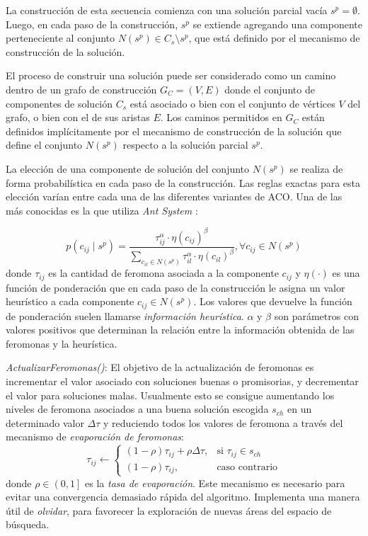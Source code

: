 \documentclass{llncs}
\begin{document}
	La construcción de esta secuencia comienza con una solución parcial vacía 
	$s^p = \emptyset$. Luego, en cada paso de la construcción, $s^p$ se extiende agregando una
	componente perteneciente al conjunto $N(s^p) \in C_s \setminus s^p$, que está definido por 
	el mecanismo de construcción de la solución.
	
	El proceso de construir una solución puede ser considerado como un camino dentro de un grafo
	de construcción $G_C = (V, E)$ donde el conjunto de componentes de solución $C_s$ está
	asociado o bien con el conjunto de vértices $V$ del grafo, o bien con el de sus aristas $E$. Los caminos permitidos en $G_C$ están definidos implícitamente por el mecanismo de construcción de la solución que define el conjunto $N(s^p)$ respecto a la solución parcial $s^p$.
	
	La elección de una componente de solución del conjunto $N(s^p)$ se realiza de forma probabilística 
	en cada paso de la construcción. Las reglas exactas para esta elección varían entre
	cada una de las diferentes variantes de ACO. Una de las más conocidas es la que utiliza \textit{Ant System} \cite{dor:man:col}:
	
	\begin{equation}
	\label{eq:chooseComponent}
	p(c_{ij} \mid s^p) = \frac{\tau_{ij}^\alpha \cdot \eta(c_{ij})^\beta}{\sum_{c_{il} \in N(s^p)} \tau_{il}^\alpha \cdot \eta(c_{il})^\beta}, \forall c_{ij} \in N(s^p)
	\end{equation}
	donde $\tau_{ij}$ es la cantidad de feromona asociada a la componente $c_{ij}$ y $\eta(\cdot)$
	es una función de ponderación que en cada paso de la construcción le asigna un valor heurístico a cada componente $c_{ij} \in N(s^p)$. Los valores que devuelve la función de ponderación suelen llamarse \textit{información heurística}. $\alpha$ y $\beta$ son parámetros con valores positivos que determinan la relación entre la información obtenida de las feromonas y la heurística.
	\bigbreak
	
	\textit{ActualizarFeromonas()}: El objetivo de la actualización de feromonas es incrementar el valor asociado con soluciones buenas o promisorias, y decrementar el valor para soluciones malas. Usualmente esto se consigue aumentando los niveles de feromona asociados a una buena solución escogida $s_{ch}$ en un determinado valor $\Delta\tau$ y reduciendo todos los valores de feromona a través del mecanismo de \textit{evaporación de feromonas}:
	\begin{equation*}
		\tau_{ij} \gets
		\begin{cases}
		(1 - \rho) \tau_{ij} + \rho\Delta\tau,& \text{si } \tau_{ij}\in s_{ch}\\
		(1 - \rho) \tau_{ij},              & \text{caso contrario}
		\end{cases}
	\end{equation*} 
	donde $\rho \in \left(0,1\right]$ es la \textit{tasa de evaporación}. Este mecanismo es necesario para evitar 
	una convergencia demasiado rápida del algoritmo. Implementa una manera útil de \textit{olvidar}, para 
	favorecer la exploración de nuevas áreas del espacio de búsqueda.
	
\end{document}

